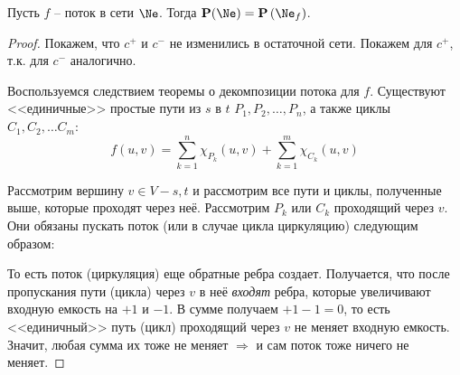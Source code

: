 \Lm Пусть $f$ -- поток в сети $\Ne$. Тогда $\P(\Ne) = \P\left(\Ne_f\right)$.
\begin{proof}

    Покажем, что $c^+$ и $c^-$ не изменились в остаточной сети. Покажем для $c^+$, т.к. для $c^-$ аналогично.

    Воспользуемся следствием теоремы о декомпозиции потока для $f$.
    Существуют <<единичные>> простые пути из $s$ в $t$ $P_1, P_2, \dots, P_n$, а также циклы $C_1, C_2, \dots C_m:$
    \begin{equation*}
        f(u, v) = \sum\limits_{k = 1}^n \chi_{P_k}(u, v) + \sum\limits_{k = 1}^m \chi_{C_k}(u, v)
    \end{equation*}

    Рассмотрим вершину $v \in V - s, t$ и рассмотрим все пути и циклы, полученные выше, которые проходят через неё.
    Рассмотрим $P_k$ или $C_k$ проходящий через $v$. Они обязаны пускать поток (или в случае цикла циркуляцию) следующим образом:

    \begin{figure}[H]
        \center
    \end{figure}
    То есть поток (циркуляция) еще обратные ребра создает. Получается, что после пропускания пути (цикла) через $v$ в неё \textit{входят} ребра, которые увеличивают входную емкость на $+1$ и $-1$. В сумме получаем $+1 - 1 = 0$, то есть <<единичный>> путь (цикл) проходящий через $v$ не меняет входную емкость. Значит, любая сумма их тоже не меняет $\Rightarrow$ и сам поток тоже ничего не меняет.

\end{proof}

